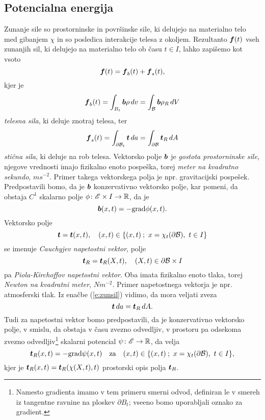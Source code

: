 \subsection{Potencialna energija}


Zunanje sile so prostorninske in površinske sile, ki delujejo na materialno telo med gibanjem $\chi$
in so posledica interakcije telesa z okoljem. Rezultanto $\boldsymbol f(t)$ vseh zunanjih sil, ki delujejo
na materialno telo ob času $t\in I$, lahko zapišemo kot vsoto
\[
	\boldsymbol f(t)=\boldsymbol f_b(t)+\boldsymbol f_s(t),
\]
kjer je
\[
	\boldsymbol f_b(t)=\int_{B_t}\boldsymbol b\rho\, dv=\int_{\mathcal B}\boldsymbol b\rho_R\, dV
\]
\emph{telesna sila}, ki deluje znotraj telesa, ter
\begin{equation}\label{e:zunsil}
	\boldsymbol f_s(t)=\int_{\partial \mathcal B_t}\boldsymbol t\, da=\int_{\partial \mathcal B}\boldsymbol t_R\, dA
\end{equation}
\emph{stična sila}, ki deluje na rob telesa.
Vektorsko polje $\boldsymbol b$ je \emph{gostota prostorninske sile}, njegove vrednosti imajo fizikalno enoto
pospeška, torej \textit{meter na kvadratno sekundo}, $ms^{-2}$. Primer takega vektorskega polja
je npr. gravitacijski pospešek. Predpostavili bomo, da je $\boldsymbol b$ konzervativno vektorsko polje,
kar pomeni, da obstaja $C^1$ skalarno polje $\phi\colon\mathscr E\times I\to\mathbb R$, da je
\begin{equation*} \label{e:gps}
	\boldsymbol b(x,t)=-\mathrm{grad}\phi(x,t).
\end{equation*}
Vektorsko polje
\begin{equation*} \label{e:csv}
	\boldsymbol t=\boldsymbol t(x,t),\quad (x,t)\in \{(x,t)\:;\ x=\chi_t(\partial \mathcal B),\ t\in I\}
\end{equation*}
se imenuje \emph{Cauchyjev napetostni vektor}, polje
\begin{equation*} \label{e:pksv}
	\boldsymbol t_R=\boldsymbol t_R(X,t),\quad (X,t)\in \partial \mathcal B\times I
\end{equation*}
pa \emph{Piola-Kirchoffov napetostni vektor}. Oba
imata fizikalno enoto tlaka, torej \textit{Newton na kvadratni meter}, $Nm^{-2}$.
Primer napetostnega vektorja je npr. atmosferski tlak.
Iz enačbe (\ref{e:zunsil}) vidimo, da mora veljati zveza
\begin{equation}\label{e:ttr}
	\boldsymbol t\, da=\boldsymbol t_R\, dA.
\end{equation}
Tudi za napetostni vektor bomo predpostavili, da je konzervativno vektorsko polje, v smislu,
da obstaja v času zvezno odvedljiv, v prostoru pa odsekoma zvezno odvedljiv\footnote{Namesto gradienta imamo v tem primeru
smerni odvod, definiran le v smereh iz tangentne ravnine na ploskev $\partial B_t$; vseeno bomo uporabljali oznako za gradient.}
skalarni potencial $\psi\colon\mathscr E\to\mathbb R$, da velja
\[ \boldsymbol t_R(x,t)=-\mathrm{grad}\psi(x,t)\quad\textrm{za}\quad (x,t)\in \{(x,t)\:;\ x=\chi_t(\partial \mathcal B),\ t\in I\}, \]
kjer je $\boldsymbol t_R(x,t)=\boldsymbol t_R(\chi(X,t),t)$ prostorski opis polja $\boldsymbol t_R$.


